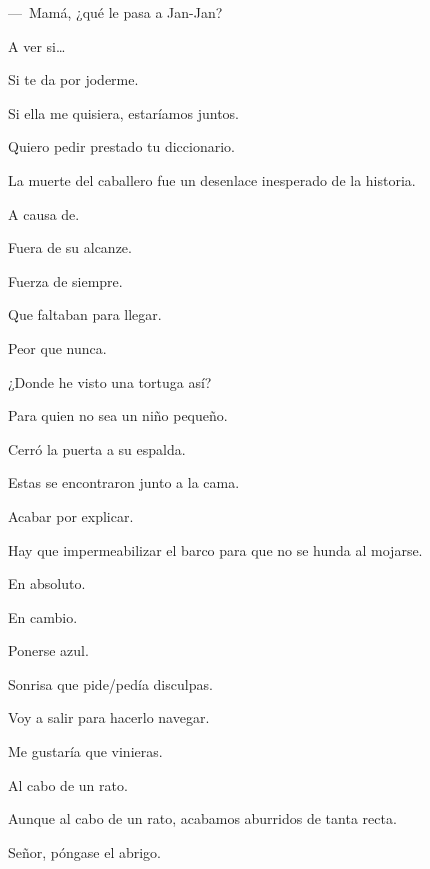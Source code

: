 \sk
---~Mamá, ¿qué le pasa a Jan-Jan? 

\sk
A ver si\ldots{} 

\sk
Si te da por joderme. \nb{}

\sk
Si ella me quisiera, estaríamos juntos. \nb{}

\sk
Quiero pedir prestado tu diccionario. \nb{}

\sk
La muerte del caballero fue un desenlace inesperado de la historia. \nb{}

\sk
A causa de. 

\sk
Fuera de su alcanze. 

\sk
Fuerza de siempre. 

\sk
Que faltaban para llegar. 

\sk
Peor que nunca. 

\sk
¿Donde he visto una tortuga así? 

\sk
Para quien no sea un niño pequeño. 

\sk
Cerró la puerta a su espalda. 

\sk
Estas se encontraron junto a la cama. 

\sk
Acabar por explicar. 

\sk
Hay que impermeabilizar el barco para que no se hunda al mojarse. 

\sk
En absoluto. 

\sk
En cambio. 

\sk
Ponerse azul. 

\sk
Sonrisa que pide/pedía disculpas. 

\sk
Voy a salir para hacerlo navegar. \nb{}

\sk
Me gustaría que vinieras. 

\sk
Al cabo de un rato. 

\sk
Aunque al cabo de un rato, acabamos aburridos de tanta recta. 

\sk
Señor, póngase el abrigo. \nb{}

